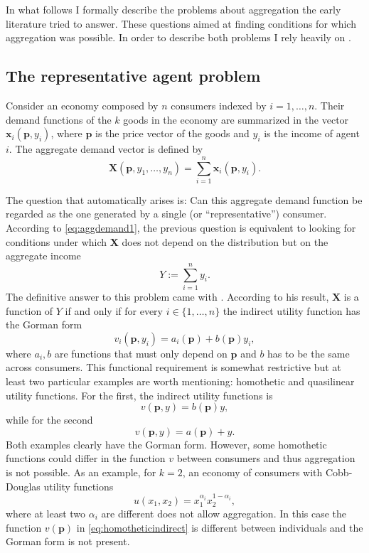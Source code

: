 \documentclass[english, a4paper,12pt]{article}
\begin{document}
In what follows I formally describe the problems about aggregation the early literature tried to answer. These questions aimed at finding conditions for which aggregation was possible. In order to describe both problems I rely heavily on \cite{VarianBook}.

\subsection{The representative agent problem} \label{ssec:RepAgent}
Consider an economy composed by $n$ consumers indexed by $i = 1, \ldots, n$. Their demand functions of the $k$ goods in the economy are summarized in the vector $\mathbf{x}_{i}(\mathbf{p}, y_{i})$, where $\mathbf{p}$ is the price vector of the goods and $y_{i}$ is the income of agent $i$. The aggregate demand vector is defined by
	\begin{equation} \label{eq:aggdemand1}
		\mathbf{X}(\mathbf{p}, y_{1}, \ldots, y_{n}) = \sum_{i=1}^{n} \mathbf{x}_{i}(\mathbf{p},y_{i}).
	\end{equation}

The question that automatically arises is: Can this aggregate demand function be regarded as the one generated by a single (or ``representative'') consumer. According to \eqref{eq:aggdemand1}, the previous question is equivalent to looking for conditions under which $\mathbf{X}$ does not depend on the distribution but on the aggregate income
	$$Y := \sum_{i=1}^{n} y_{i}.$$
The definitive answer to this problem came with \cite{Gorman53}. According to his result, $\mathbf{X}$ is a function of $Y$ if and only if for every $i \in \{1,\ldots,n\}$ the indirect utility function has the Gorman form
	$$v_{i}(\mathbf{p}, y_{i}) = a_{i}(\mathbf{p}) + b(\mathbf{p})y_{i},$$ 
where $a_{i}, b$ are functions that must only depend on $\mathbf{p}$ and $b$ has to be the same across consumers. This functional requirement is somewhat restrictive but at least two particular examples are worth mentioning: homothetic and quasilinear utility functions. For the first, the indirect utility functions is
	\begin{equation} \label{eq:homotheticindirect}
		v(\mathbf{p}, y) = b(\mathbf{p})y,
	\end{equation}
while for the second
	$$v(\mathbf{p}, y) = a(\mathbf{p}) + y.$$
Both examples clearly have the Gorman form. However, some homothetic functions could differ in the function $v$ between consumers and thus aggregation is not possible. As an example, for $k = 2$, an economy of consumers with Cobb-Douglas utility functions
	$$u(x_{1}, x_{2}) = x_{1}^{\alpha_{i}}x_{2}^{1-\alpha_{i}},$$
where at least two $\alpha_{i}$ are different does not allow aggregation. In this case the function $v(\mathbf{p})$ in \eqref{eq:homotheticindirect} is different between individuals and the Gorman form is not present.
\end{document}

